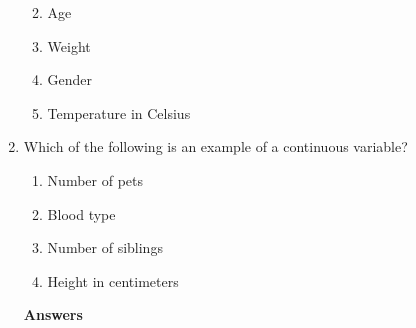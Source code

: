 \documentclass[
]{book}
\begin{document}
\begin{enumerate}
  \begin{enumerate}
  \def\labelenumii{\alph{enumii}.}
  \item
    Age
  \item
    Weight
  \item
    Gender
  \item
    Temperature in Celsius
  \end{enumerate}
\item
  Which of the following is an example of a continuous variable?

  \begin{enumerate}
  \def\labelenumii{\alph{enumii}.}
  \item
    Number of pets
  \item
    Blood type
  \item
    Number of siblings
  \item
    Height in centimeters
  \end{enumerate}

  \textbf{Answers}
\end{enumerate}
\end{document}

